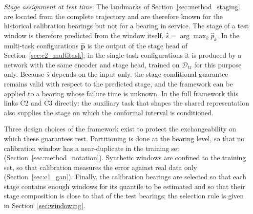 %
\textit{Stage assignment at test time.} The landmarks of
Section~\ref{sec:method_staging} are located from the complete
trajectory and are therefore known for the historical calibration
bearings but not for a bearing in service. The stage of a test window
is therefore predicted from the window itself,
$\hat{s} = \arg\max_k \hat{p}_k$. In the multi-task configurations
$\hat{\mathbf{p}}$ is the output of the stage head of
Section~\ref{sec:c2_multitask}; in the single-task configurations it is
produced by a network with the same encoder and stage head, trained on
$\mathcal{D}_{\mathrm{tr}}$ for this purpose only. Because $\hat{s}$
depends on the input only, the stage-conditional guarantee remains
valid with respect to the predicted stage, and the framework can be
applied to a bearing whose failure time is unknown. In the full
framework this links C2 and C3 directly: the auxiliary task that shapes
the shared representation also supplies the stage on which the
conformal interval is conditioned.
%

Three design choices of the framework exist to protect the
exchangeability on which these guarantees rest. Partitioning is done
at the bearing level, so that no calibration window has a
near-duplicate in the training set
(Section~\ref{sec:method_notation}). Synthetic windows are confined to
the training set, so that calibration measures the error against real
data only (Section~\ref{sec:c1_gan}). Finally, the calibration
bearings are selected so that each stage contains enough windows for
its quantile to be estimated and so that their stage composition is
close to that of the test bearings; the selection rule is given in
Section~\ref{sec:windowing}.

